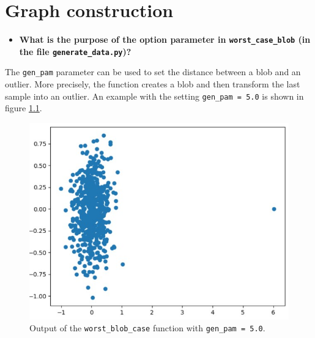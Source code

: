 \documentclass[a4paper, 11pt]{report}
\begin{document}

\maketitle



\chapter{Graph construction}



\begin{itemize}
    \item[1.1.] \textbf{What is the purpose of the option parameter in \texttt{worst\_case\_blob} (in the file \texttt{generate\_data.py})?}
\end{itemize}

    The \texttt{gen\_pam} parameter can be used to set the distance between a blob and an outlier. More precisely, the function creates a blob and then transform the last sample into an outlier. An example with the setting \texttt{gen\_pam = 5.0} is shown in figure \ref{fig:worst-blob-case}. 
    
    \begin{figure}[!h]
        \centering
        \includegraphics[scale=0.8]{images/worst_blob_case.jpg}
        \caption{Output of the \texttt{worst\_blob\_case} function with \texttt{gen\_pam = 5.0}.}
        \label{fig:worst-blob-case}
    \end{figure}
    
\end{document}
